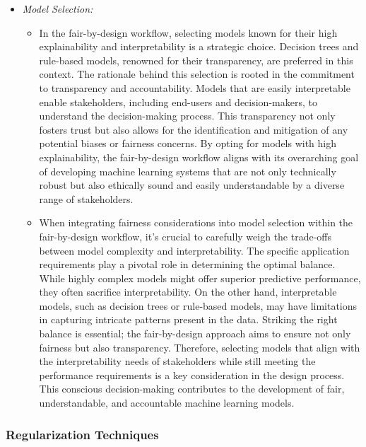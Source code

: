 \begin{itemize}

    \item \emph{Model Selection:}

    \begin{itemize}

        \item In the fair-by-design workflow, selecting models known for their high explainability and interpretability is a strategic choice. Decision trees and rule-based models, renowned for their transparency, are preferred in this context. The rationale behind this selection is rooted in the commitment to transparency and accountability. Models that are easily interpretable enable stakeholders, including end-users and decision-makers, to understand the decision-making process. This transparency not only fosters trust but also allows for the identification and mitigation of any potential biases or fairness concerns. By opting for models with high explainability, the fair-by-design workflow aligns with its overarching goal of developing machine learning systems that are not only technically robust but also ethically sound and easily understandable by a diverse range of stakeholders.

        \item When integrating fairness considerations into model selection within the fair-by-design workflow, it's crucial to carefully weigh the trade-offs between model complexity and interpretability. The specific application requirements play a pivotal role in determining the optimal balance. While highly complex models might offer superior predictive performance, they often sacrifice interpretability. On the other hand, interpretable models, such as decision trees or rule-based models, may have limitations in capturing intricate patterns present in the data. Striking the right balance is essential; the fair-by-design approach aims to ensure not only fairness but also transparency. Therefore, selecting models that align with the interpretability needs of stakeholders while still meeting the performance requirements is a key consideration in the design process. This conscious decision-making contributes to the development of fair, understandable, and accountable machine learning models.

    \end{itemize}

\end{itemize}

\subsubsection{Regularization Techniques}

